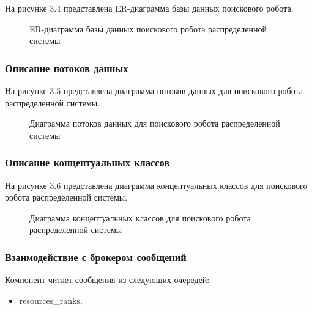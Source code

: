 На рисунке 3.4 представлена ER-диаграмма базы данных поискового робота.

\begin{figure}[H]
\caption{ER-диаграмма базы данных поискового робота распределенной системы}
\label{robot/robot_db:image}
\end{figure}

\subsubsection{Описание потоков данных}

На рисунке 3.5 представлена диаграмма потоков данных для поискового робота распределенной системы.

\begin{figure}[H]
\caption{Диаграмма потоков данных для поискового робота распределенной системы}
\label{robot/diagram_dataflow:image}
\end{figure}

\subsubsection{Описание концептуальных классов}

На рисунке 3.6 представлена диаграмма концептуальных классов для поискового робота распределенной системы.

\begin{figure}[H]
\caption{Диаграмма концептуальных классов для поискового робота распределенной системы}
\label{robot/diagram_classes:image}
\end{figure}

\subsubsection{Взаимодействие с брокером сообщений}

Компонент читает сообщения из следующих очередей:
\begin{itemize}
\item resources\_ranks.
\end{itemize}

